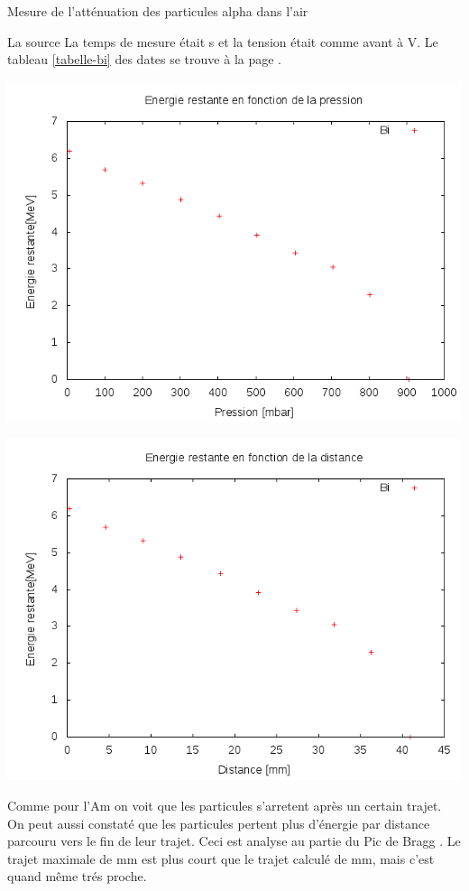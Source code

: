 \documentclass[a4paper,11pt,liststotocnumbered,bibtotocnumbered]{scrartcl}
\begin{document}
\begin{section}{Mesure de l'atténuation des particules alpha dans l'air}
   \begin{subsection}{La source }
    La temps de mesure était \unit[30]{s} et la tension était comme avant à \unit[80]{V}. Le tableau \ref{tabelle-bi} des dates se trouve à la page \pageref{tabelle-bi}.\\
    \begin{minipage}{0.45\textwidth}
     \includegraphics[width=\textwidth]{Sabine/bi_pression.png}
    \end{minipage}
    \hfill
    \begin{minipage}{0.45\textwidth}
     \includegraphics[width=\textwidth]{Sabine/bi_distance.png}
    \end{minipage}
   Comme pour l'Am on voit que les particules s'arretent après un certain trajet. On peut aussi constaté que les particules pertent plus d'énergie par distance parcouru vers le fin de leur trajet. Ceci est analyse au partie du Pic de Bragg \pageref{Bragg}. Le trajet maximale de \unit[41]{mm} est plus court que le trajet calculé de \unit[44,5]{mm}, mais c'est quand même trés proche.
   \end{subsection}


\end{section}
\end{document}
